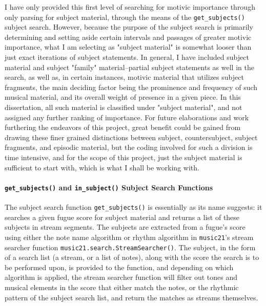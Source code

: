 I have only provided this first level of searching for motivic
importance through only parsing for subject material, through the means
of the \texttt{get\_subjects()} subject search. However, because the
purpose of the subject search is primarily determining and setting aside
certain intervals and passages of greater motivic importance, what I am
selecting as "subject material" is somewhat looser than just exact
iterations of subject statements. In general, I have included subject
material and subject "family" material--partial subject statements as
well in the search, as well as, in certain instances, motivic material
that utilizes subject fragments, the main deciding factor being the
prominence and frequency of such musical material, and its overall
weight of presence in a given piece. In this dissertation, all such
material is classified under "subject material", and not assigned any
further ranking of importance. For future elaborations and work
furthering the endeavors of this project, great benefit could be gained
from drawing these finer grained distinctions between subject,
countersubject, subject fragments, and episodic material, but the coding
involved for such a division is time intensive, and for the scope of
this project, just the subject material is sufficient to start with,
which is what I shall be working with.

\paragraph{\texorpdfstring{\texttt{get\_subjects()} and
\texttt{in\_subject()} Subject Search
Functions}{get\_subjects() and in\_subject() Subject Search Functions}}\label{get_subjects-and-in_subject-subject-search-functions}

The subject search function \texttt{get\_subjects()} is essentially as
its name suggests: it searches a given fugue score for subject material
and returns a list of these subjects in stream segments. The subjects
are extracted from a fugue's score using either the note name algorithm
or rhythm algorithm in \texttt{music21}'s stream searcher function
\texttt{music21.search.StreamSearcher()}. The subject, in the form of a
search list (a stream, or a list of notes), along with the score the
search is to be performed upon, is provided to the function, and
depending on which algorithm is applied, the stream searcher function
will filter out tones and musical elements in the score that either
match the notes, or the rhythmic pattern of the subject search list, and
return the matches as streams themselves.

